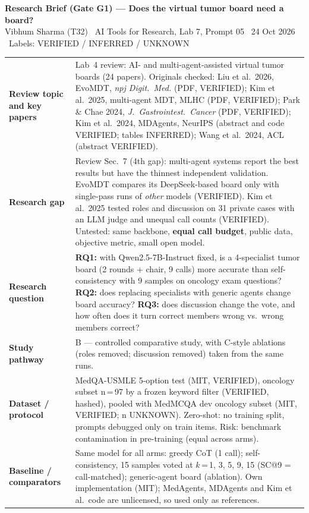 \documentclass[11pt]{article}
\begin{document}
{\large\textbf{Research Brief (Gate G1) --- Does the virtual tumor board need a board?}}\\[2pt]
\small Vibhum Sharma (T32) \textbullet\ AI Tools for Research, Lab 7, Prompt 05 \textbullet\ 24 Oct 2026 \textbullet\ Labels: VERIFIED / INFERRED / UNKNOWN

\vspace{6pt}
\normalsize
\begin{tabularx}{\textwidth}{@{}>{\raggedright\arraybackslash}p{3.1cm}L@{}}
\toprule
\textbf{Review topic and key papers} & Lab~4 review: AI- and multi-agent-assisted virtual tumor boards (24 papers). Originals checked: Liu et al.\ 2026, EvoMDT, \emph{npj Digit.\ Med.} (PDF, VERIFIED); Kim et al.\ 2025, multi-agent MDT, MLHC (PDF, VERIFIED); Park \& Chae 2024, \emph{J.\ Gastrointest.\ Cancer} (PDF, VERIFIED); Kim et al.\ 2024, MDAgents, NeurIPS (abstract and code VERIFIED; tables INFERRED); Wang et al.\ 2024, ACL (abstract VERIFIED). \\
\textbf{Research gap} & Review Sec.~7 (4th gap): multi-agent systems report the best results but have the thinnest independent validation. EvoMDT compares its DeepSeek-based board only with single-pass runs of \emph{other} models (VERIFIED). Kim et al.\ 2025 tested roles and discussion on 31 private cases with an LLM judge and unequal call counts (VERIFIED). Untested: same backbone, \textbf{equal call budget}, public data, objective metric, small open model. \\
\textbf{Research question} & \textbf{RQ1:} with Qwen2.5-7B-Instruct fixed, is a 4-specialist tumor board (2 rounds + chair, 9 calls) more accurate than self-consistency with 9 samples on oncology exam questions? \textbf{RQ2:} does replacing specialists with generic agents change board accuracy? \textbf{RQ3:} does discussion change the vote, and how often does it turn correct members wrong vs.\ wrong members correct? \\
\textbf{Study pathway} & B --- controlled comparative study, with C-style ablations (roles removed; discussion removed) taken from the same runs. \\
\textbf{Dataset / protocol} & MedQA-USMLE 5-option test (MIT, VERIFIED), oncology subset n\,=\,97 by a frozen keyword filter (VERIFIED, hashed), pooled with MedMCQA dev oncology subset (MIT, VERIFIED; n UNKNOWN). Zero-shot: no training split, prompts debugged only on train items. Risk: benchmark contamination in pre-training (equal across arms). \\
\textbf{Baseline / comparators} & Same model for all arms: greedy CoT (1 call); self-consistency, 15 samples voted at $k$\,=\,1, 3, 5, 9, 15 (SC@9 = call-matched); generic-agent board (ablation). Own implementation (MIT); MedAgents, MDAgents and Kim et al.\ code are unlicensed, so used only as references. \\

\end{tabularx}
\end{document}
